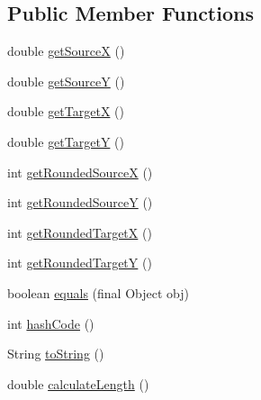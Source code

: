 \subsection*{Public Member Functions}
\begin{DoxyCompactItemize}
\item 
double \hyperlink{classorg_1_1tzi_1_1use_1_1gui_1_1views_1_1diagrams_1_1util_1_1_directed_line_ad9249febb12231cb83f29bd8e25e0256}{get\-Source\-X} ()
\item 
double \hyperlink{classorg_1_1tzi_1_1use_1_1gui_1_1views_1_1diagrams_1_1util_1_1_directed_line_a83c6f96758b1380c8f19b79c05ec1347}{get\-Source\-Y} ()
\item 
double \hyperlink{classorg_1_1tzi_1_1use_1_1gui_1_1views_1_1diagrams_1_1util_1_1_directed_line_af839307f54b2f37a78359eb65681c2c1}{get\-Target\-X} ()
\item 
double \hyperlink{classorg_1_1tzi_1_1use_1_1gui_1_1views_1_1diagrams_1_1util_1_1_directed_line_a5c0e97e1aa89eb1ef3ad2ca1d28585e8}{get\-Target\-Y} ()
\item 
int \hyperlink{classorg_1_1tzi_1_1use_1_1gui_1_1views_1_1diagrams_1_1util_1_1_directed_line_a6413b0c3a283b593d0175421647eb199}{get\-Rounded\-Source\-X} ()
\item 
int \hyperlink{classorg_1_1tzi_1_1use_1_1gui_1_1views_1_1diagrams_1_1util_1_1_directed_line_a2a580ebd17b2cc3270fd6b1c23239c59}{get\-Rounded\-Source\-Y} ()
\item 
int \hyperlink{classorg_1_1tzi_1_1use_1_1gui_1_1views_1_1diagrams_1_1util_1_1_directed_line_ad4d1ec058f8a653075a2219dd032decf}{get\-Rounded\-Target\-X} ()
\item 
int \hyperlink{classorg_1_1tzi_1_1use_1_1gui_1_1views_1_1diagrams_1_1util_1_1_directed_line_a1b6961f17e9af2410c47f96e4863127b}{get\-Rounded\-Target\-Y} ()
\item 
boolean \hyperlink{classorg_1_1tzi_1_1use_1_1gui_1_1views_1_1diagrams_1_1util_1_1_directed_line_a345ec7120e23fa47028822ee16c96095}{equals} (final Object obj)
\item 
int \hyperlink{classorg_1_1tzi_1_1use_1_1gui_1_1views_1_1diagrams_1_1util_1_1_directed_line_a5ebdd58d6d0eb16e111ee153d85a53c6}{hash\-Code} ()
\item 
String \hyperlink{classorg_1_1tzi_1_1use_1_1gui_1_1views_1_1diagrams_1_1util_1_1_directed_line_ae9ce9e9722d284a0383b85f15ea51839}{to\-String} ()
\item 
double \hyperlink{classorg_1_1tzi_1_1use_1_1gui_1_1views_1_1diagrams_1_1util_1_1_directed_line_a07ef53f3dcf3870ea2f07dbe81b87c57}{calculate\-Length} ()

\end{DoxyCompactItemize}
